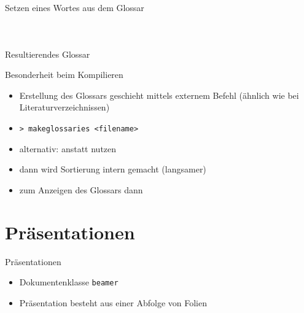 \documentclass[presentation,aspectratio=169]{beamer}
\begin{document}
\begin{frame}[fragile]{Setzen eines Wortes aus dem Glossar}
  \begin{columns}
    \begin{column}{.49\textwidth}
      
    \end{column}
    \begin{column}{.5\textwidth}
      \inputminted{latex}{codebeispiele/glossaries-usage.tex}
    \end{column}
  \end{columns}
\end{frame}

\begin{frame}{Resultierendes Glossar}
  \printglossary
\end{frame}

\begin{frame}[fragile]{Besonderheit beim Kompilieren}
  \begin{itemize}
    \item Erstellung des Glossars geschieht mittels externem Befehl (ähnlich wie bei Literaturverzeichnissen)
    \item \verb|> makeglossaries <filename>|
    \vspace{1em}
    \item alternativ: anstatt   nutzen
    \item dann wird Sortierung intern gemacht (langsamer)
    \item zum Anzeigen des Glossars dann 
  \end{itemize}
\end{frame}

\section{Präsentationen}

\begin{frame}[fragile]{Präsentationen}
  \begin{itemize}
    \item Dokumentenklasse \verb|beamer|
    \item Präsentation besteht aus einer Abfolge von Folien
      \inputminted{latex}{codebeispiele/beamer-frame.tex}
  \end{itemize}
\end{frame}
\end{document}
